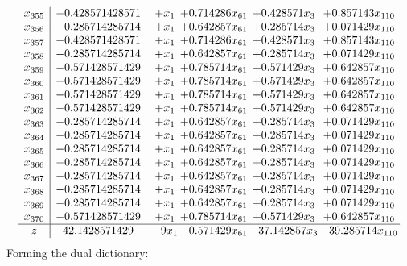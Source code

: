 \documentclass[11pt]{article}
\begin{document}
\[\begin{array}{c| c c@{\hskip 2pt} c@{\hskip 2pt} c@{\hskip 2pt} c@{\hskip 2pt} }
 x_{355}   &  -0.428571428571 & +  x_{1} & + 0.714286 x_{61} & + 0.428571 x_{3} & + 0.857143 x_{110}\\
 x_{356}   &  -0.285714285714 & +  x_{1} & + 0.642857 x_{61} & + 0.285714 x_{3} & + 0.071429 x_{110}\\
 x_{357}   &  -0.428571428571 & +  x_{1} & + 0.714286 x_{61} & + 0.428571 x_{3} & + 0.857143 x_{110}\\
 x_{358}   &  -0.285714285714 & +  x_{1} & + 0.642857 x_{61} & + 0.285714 x_{3} & + 0.071429 x_{110}\\
 x_{359}   &  -0.571428571429 & +  x_{1} & + 0.785714 x_{61} & + 0.571429 x_{3} & + 0.642857 x_{110}\\
 x_{360}   &  -0.571428571429 & +  x_{1} & + 0.785714 x_{61} & + 0.571429 x_{3} & + 0.642857 x_{110}\\
 x_{361}   &  -0.571428571429 & +  x_{1} & + 0.785714 x_{61} & + 0.571429 x_{3} & + 0.642857 x_{110}\\
 x_{362}   &  -0.571428571429 & +  x_{1} & + 0.785714 x_{61} & + 0.571429 x_{3} & + 0.642857 x_{110}\\
 x_{363}   &  -0.285714285714 & +  x_{1} & + 0.642857 x_{61} & + 0.285714 x_{3} & + 0.071429 x_{110}\\
 x_{364}   &  -0.285714285714 & +  x_{1} & + 0.642857 x_{61} & + 0.285714 x_{3} & + 0.071429 x_{110}\\
 x_{365}   &  -0.285714285714 & +  x_{1} & + 0.642857 x_{61} & + 0.285714 x_{3} & + 0.071429 x_{110}\\
 x_{366}   &  -0.285714285714 & +  x_{1} & + 0.642857 x_{61} & + 0.285714 x_{3} & + 0.071429 x_{110}\\
 x_{367}   &  -0.285714285714 & +  x_{1} & + 0.642857 x_{61} & + 0.285714 x_{3} & + 0.071429 x_{110}\\
 x_{368}   &  -0.285714285714 & +  x_{1} & + 0.642857 x_{61} & + 0.285714 x_{3} & + 0.071429 x_{110}\\
 x_{369}   &  -0.285714285714 & +  x_{1} & + 0.642857 x_{61} & + 0.285714 x_{3} & + 0.071429 x_{110}\\
 x_{370}   &  -0.571428571429 & +  x_{1} & + 0.785714 x_{61} & + 0.571429 x_{3} & + 0.642857 x_{110}\\
\hline
z    &  42.1428571429 & -9 x_{1} & -0.571429 x_{61} & -37.142857 x_{3} & -39.285714 x_{110}\\
\end{array}\]
Forming the dual dictionary:
\end{document}
